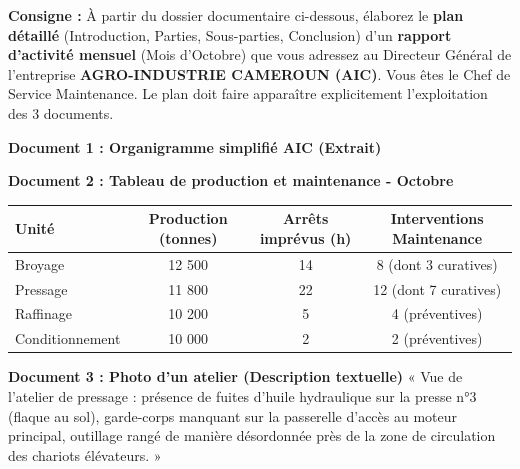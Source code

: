 \documentclass[11pt]{article}
\begin{document}
\begin{exercice}
\textbf{Consigne :} À partir du dossier documentaire ci-dessous, élaborez le \textbf{plan détaillé} (Introduction, Parties, Sous-parties, Conclusion) d'un \textbf{rapport d'activité mensuel} (Mois d'Octobre) que vous adressez au Directeur Général de l'entreprise \textbf{AGRO-INDUSTRIE CAMEROUN (AIC)}. Vous êtes le Chef de Service Maintenance. Le plan doit faire apparaître explicitement l'exploitation des 3 documents.

\textbf{Document 1 : Organigramme simplifié AIC (Extrait)}
\begin{center}
\end{center}

\textbf{Document 2 : Tableau de production et maintenance - Octobre}
\begin{center}
\begin{tabularx}{\linewidth}{|X|c|c|c|}\hline
\rowcolor{popblueL} \textbf{Unité} & \textbf{Production (tonnes)} & \textbf{Arrêts imprévus (h)} & \textbf{Interventions Maintenance} \\ \hline
Broyage & 12 500 & 14 & 8 (dont 3 curatives) \\ \hline
Pressage & 11 800 & 22 & 12 (dont 7 curatives) \\ \hline
Raffinage & 10 200 & 5 & 4 (préventives) \\ \hline
Conditionnement & 10 000 & 2 & 2 (préventives) \\ \hline
\end{tabularx}
\end{center}

\textbf{Document 3 : Photo d'un atelier (Description textuelle)}
« Vue de l'atelier de pressage : présence de fuites d'huile hydraulique sur la presse n°3 (flaque au sol), garde-corps manquant sur la passerelle d'accès au moteur principal, outillage rangé de manière désordonnée près de la zone de circulation des chariots élévateurs. »


\end{exercice}
\end{document}
